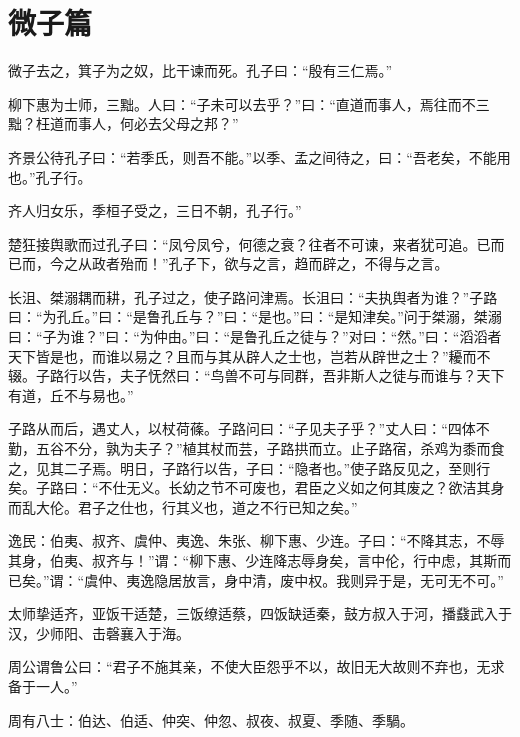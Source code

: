 \documentclass[12pt,a4paper]{ctexbook}
\begin{document}
\section{微子篇}
微子去之，箕子为之奴，比干谏而死。孔子曰：“殷有三仁焉。”\par
柳下惠为士师，三黜。人曰：“子未可以去乎？”曰：“直道而事人，焉往而不三黜？枉道而事人，何必去父母之邦？”\par
齐景公待孔子曰：“若季氏，则吾不能。”以季、孟之间待之，曰：“吾老矣，不能用也。”孔子行。\par
齐人归女乐，季桓子受之，三日不朝，孔子行。”\par
楚狂接舆歌而过孔子曰：“凤兮凤兮，何德之衰？往者不可谏，来者犹可追。已而已而，今之从政者殆而！”孔子下，欲与之言，趋而辟之，不得与之言。\par
长沮、桀溺耦而耕，孔子过之，使子路问津焉。长沮曰：“夫执舆者为谁？”子路曰：“为孔丘。”曰：“是鲁孔丘与？”曰：“是也。”曰：“是知津矣。”问于桀溺，桀溺曰：“子为谁？”曰：“为仲由。”曰：“是鲁孔丘之徒与？”对曰：“然。”曰：“滔滔者天下皆是也，而谁以易之？且而与其从辟人之士也，岂若从辟世之士？”耰而不辍。子路行以告，夫子怃然曰：“鸟兽不可与同群，吾非斯人之徒与而谁与？天下有道，丘不与易也。”\par
子路从而后，遇丈人，以杖荷蓧。子路问曰：“子见夫子乎？”丈人曰：“四体不勤，五谷不分，孰为夫子？”植其杖而芸，子路拱而立。止子路宿，杀鸡为黍而食之，见其二子焉。明日，子路行以告，子曰：“隐者也。”使子路反见之，至则行矣。子路曰：“不仕无义。长幼之节不可废也，君臣之义如之何其废之？欲洁其身而乱大伦。君子之仕也，行其义也，道之不行已知之矣。”\par
逸民：伯夷、叔齐、虞仲、夷逸、朱张、柳下惠、少连。子曰：“不降其志，不辱其身，伯夷、叔齐与！”谓：“柳下惠、少连降志辱身矣，言中伦，行中虑，其斯而已矣。”谓：“虞仲、夷逸隐居放言，身中清，废中权。我则异于是，无可无不可。”\par
太师挚适齐，亚饭干适楚，三饭缭适蔡，四饭缺适秦，鼓方叔入于河，播鼗武入于汉，少师阳、击磬襄入于海。\par
周公谓鲁公曰：“君子不施其亲，不使大臣怨乎不以，故旧无大故则不弃也，无求备于一人。”\par
周有八士：伯达、伯适、仲突、仲忽、叔夜、叔夏、季随、季騧。\par
\end{document}

